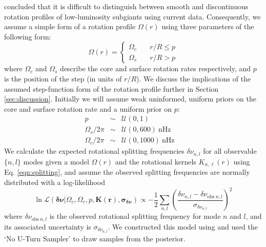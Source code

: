\citet{deheuvels_seismic_2014} concluded that it is difficult to distinguish between smooth and discontinuous rotation profiles of low-luminosity subgiants using current data.
Consequently, we assume a simple form of a rotation profile $\Omega(r)$ using three parameters of the following form:
\begin{equation}
\Omega(r) = \left\{
        \begin{array}{ll}
            \Omega_c & \quad r/R \leq p \\
            \Omega_s & \quad r/R > p
        \end{array}
    \right.
    \label{eqn:step}
\end{equation}
\noindent{}where $\Omega_c$ and $\Omega_s$ describe the core and surface rotation rates respectively, and $p$ is the position of the step (in units of $r/R$). We discuss the implications of the assumed step-function form of the rotation profile further in Section \ref{sec:discussion}. Initially we will assume weak uninformed, uniform priors on the core and surface rotation rate and a uniform prior on $p$:
\begin{eqnarray}
    p &\sim& \mathcal{U}\left(0, 1\right) \\
    \Omega_s/2\pi &\sim& \mathcal{U}\left(0, 600\right) \ \mathrm{nHz} \\
    \Omega_c/2\pi &\sim& \mathcal{U}\left(0, 1000\right)\ \mathrm{nHz}\quad
\end{eqnarray}
We calculate the expected rotational splitting frequencies $\delta\nu_{n,l}$ for all observable $\{n,l\}$ modes given a model $\Omega(r)$ and the rotational kernels ${K}_{n,\ell}(r)$ using Eq. \ref{eqn:splitting}, and assume the observed splitting frequencies are normally distributed with a log-likelihood
\begin{equation}
    \ln \mathcal{L}( \pmb{ \delta\nu } | \Omega_c,\Omega_r,p, \mathbf{{K}(r)}, \pmb{ \sigma_{\delta\nu} } ) \propto -\frac{1}{2}\sum_{n,l}\left(\frac{\delta \nu_{n,l} - \delta \nu_{\mathrm{obs} \ n,l}}{\sigma_{\delta \nu_{n,l}}}\right)^2 
    \label{eqn:lnl}
\end{equation}
where $\delta\nu_{\mathrm{obs} \ n,l}$ is the observed rotational splitting frequency for mode $n$ and $l$, and its associated uncertainty is $\sigma_{\delta\nu_{n,l}}$.
We constructed this model using \pymc{} \citep{salvatier_probabilistic_2016} and used the `No U-Turn Sampler' \citep{hoffman_no-u-turn_2011} to draw samples from the posterior.

